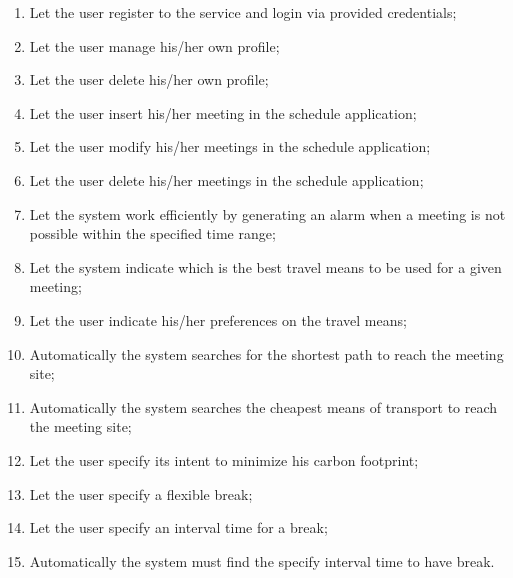 \documentclass{article}
\begin{document}
	\begin{enumerate}
		\item Let the user register to the service and login via provided credentials;
		\item Let the user manage his/her own profile;
		\item Let the user delete his/her own profile;
		\item Let the user insert his/her meeting in the schedule application;
		\item Let the user modify his/her meetings in the schedule application;
		\item Let the user delete his/her meetings in the schedule application;
		\item Let the system work efficiently by generating an alarm when a meeting is not possible within the specified time range;
		\item Let the system indicate which is the best travel means to be used for a given meeting;
		\item Let the user indicate his/her preferences on the travel means;
		\item Automatically the system searches for the shortest path to reach the meeting site;
		\item Automatically the system searches the cheapest means of transport to reach the meeting site;
		\item Let the user specify its intent to minimize his carbon footprint;
		\item Let the user specify a flexible break; 
		\item Let the user specify an interval time for a break;
		\item Automatically the system must find the specify interval time to have break.
	\end{enumerate}

	
\end{document}
